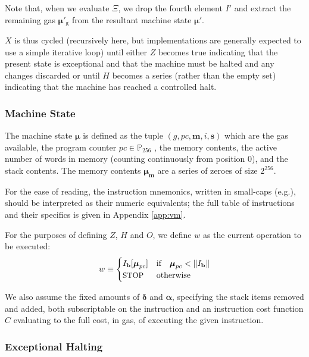 \documentclass[9pt,oneside]{amsart}
\makeatletter
\newcommand*\eg{e.g.\@\xspace}
\makeatother
\begin{document}
\begin{multicols}{2}
Note that, when we evaluate $\Xi$, we drop the fourth element $I'$ and extract the remaining gas $\boldsymbol{\mu}'_{\mathrm{g}}$ from the resultant machine state $\boldsymbol{\mu}'$.

$X$ is thus cycled (recursively here, but implementations are generally expected to use a simple iterative loop) until either $Z$ becomes true indicating that the present state is exceptional and that the machine must be halted and any changes discarded or until $H$ becomes a series (rather than the empty set) indicating that the machine has reached a controlled halt.

\subsubsection{Machine State}
The machine state $\boldsymbol{\mu}$ is defined as the tuple $(g, pc, \mathbf{m}, i, \mathbf{s})$ which are the gas available, the program counter $pc \in \mathbb{P}_{256}$ , the memory contents, the active number of words in memory (counting continuously from position 0), and the stack contents. The memory contents $\boldsymbol{\mu}_{\mathbf{m}}$ are a series of zeroes of size $2^{256}$.

For the ease of reading, the instruction mnemonics, written in small-caps (\eg {}), should be interpreted as their numeric equivalents; the full table of instructions and their specifics is given in Appendix \ref{app:vm}.

For the purposes of defining $Z$, $H$ and $O$, we define $w$ as the current operation to be executed:
\begin{equation}\label{eq:currentoperation}
w \equiv \begin{cases} I_{\mathbf{b}}[\boldsymbol{\mu}_{pc}] & \text{if} \quad \boldsymbol{\mu}_{pc} < \lVert I_{\mathbf{b}} \rVert \\
\text{\small STOP} & \text{otherwise}
\end{cases}
\end{equation}

We also assume the fixed amounts of $\mathbf{\delta}$ and $\mathbf{\alpha}$, specifying the stack items removed and added, both subscriptable on the instruction and an instruction cost function $C$ evaluating to the full cost, in gas, of executing the given instruction.

\subsubsection{Exceptional Halting}\hypertarget{Exceptional_Halting_function_Z}{}


\end{multicols}
\end{document}
